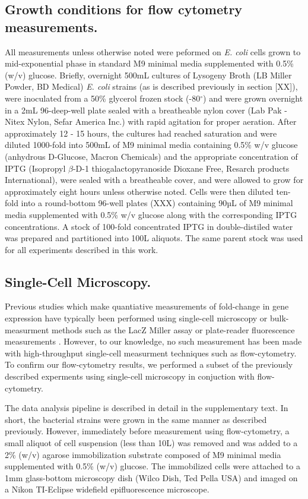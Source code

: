 \subsection{Growth conditions for flow cytometry measurements.}
All measurements unless otherwise noted were peformed on \textit{E. coli} cells
grown to mid-exponential phase in standard M9 minimal media supplemented with
0.5\% (w/v) glucose. Briefly, overnight 500mL cultures of Lysogeny Broth (LB
Miller Powder, BD Medical) \textit{E. coli} strains (as is described previously
in section [XX]), were inoculated from a 50\% glycerol frozen stock
(-80$^\circ$) and were grown overnight in a 2mL 96-deep-well plate sealed with
a breatheable nylon cover (Lab Pak - Nitex Nylon, Sefar America Inc.) with
rapid agitation for proper aeration. After approximately 12 - 15 hours, the
cultures had reached saturation and were diluted 1000-fold into 500mL of M9
minimal media containing 0.5\% w/v glucose (anhydrous D-Glucose, Macron
Chemicals) and the appropriate concentration of IPTG (Isopropyl $\beta$-D-1
thiogalactopyranoside Dioxane Free, Resarch products International), were
sealed with a breatheable cover, and were allowed to grow for approximately
eight hours unless otherwise noted. Cells were then diluted ten-fold into a
round-bottom 96-well plates (XXX) containing 90µL of M9 minimal media
supplemented with 0.5\% w/v glucose along with the corresponding IPTG
concentrations. A stock of 100-fold concentrated IPTG in double-distiled water
was prepared and partitioned into 100\textmu L aliquots. The same parent stock
was used for all experiments described in this work.

\subsection{Single-Cell Microscopy.}
Previous studies which make quantiative measurements of fold-change in gene
expression have typically been performed using single-cell microscopy
\cite{Brewster2014, Jones2014} or bulk-measurment methods such as the LacZ
Miller assay or plate-reader fluorescence measurements \cite{Garcia2011,
Razo-Mejia2014}. However, to our knowledge, no such measurement has been made
with high-throughput single-cell  measurment techniques such as flow-cytometry.
To confirm our flow-cytometry results, we performed a subset of the previously
described experments using  single-cell microscopy in conjuction with flow-
cytometry.

The data analysis pipeline is described in detail in the supplementary text. In
short, the bacterial strains were grown in the same manner as described
previously. However, immediately before measurement using flow-cytometry, a
small aliquot of cell suspension (less than 10\textmu L) was removed and was
added to a 2\% (w/v) agarose immobilization substrate composed of M9 minimal
media supplemented with 0.5\% (w/v) glucose. The immobilized cells were
attached to a 1mm glass-bottom microscopy dish (Wilco Dish, Ted Pella USA) and
imaged on a Nikon TI-Eclipse widefield epifluorescence microscope.

